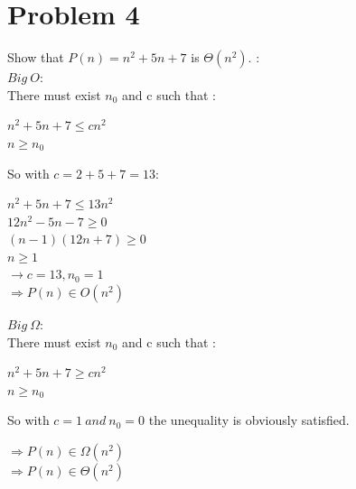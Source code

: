 \documentclass{report}
\newcommand\tab[1][1cm]{\hspace*{#1}}
\begin{document}
    \section*{\huge Problem 4}
        Show that $P(n) = n^2 + 5n + 7$  is $\Theta(n^2).$ : \\
        \tab $Big\ O:$\\
        \tab There must exist $n_0$ and c such that :
        \begin{center}
            $n^2 + 5n + 7 \leq cn^2$\\
            \large $n \geq n_0$
        \end{center}
        \tab So with $c = 2 + 5 + 7 = 13 : $
        \begin{center}
            $n^2 + 5n + 7 \leq 13n^2$\\
            $12n^2 - 5n - 7 \geq 0$\\
            $(n-1)(12n + 7) \geq 0$\\
            $n \geq 1$\\
            \large $\rightarrow c = 13, n_0  = 1$\\
            \Large $\Rightarrow P(n) \in O(n^2)$ \\
        \end{center}
        \tab $Big\ \Omega:$\\
        \tab There must exist $n_0$ and c such that :
        \begin{center}
            $n^2 + 5n + 7 \geq cn^2$\\
            \large $n \geq n_0$
        \end{center}
        \tab So with $c = 1\ and\ n_0 = 0 $ the unequality is obviously satisfied.
        \begin{center}
            \Large $\Rightarrow P(n) \in \Omega(n^2)$ \\
            \huge $\Rightarrow P(n) \in \Theta(n^2)$
        \end{center}
\end{document}

